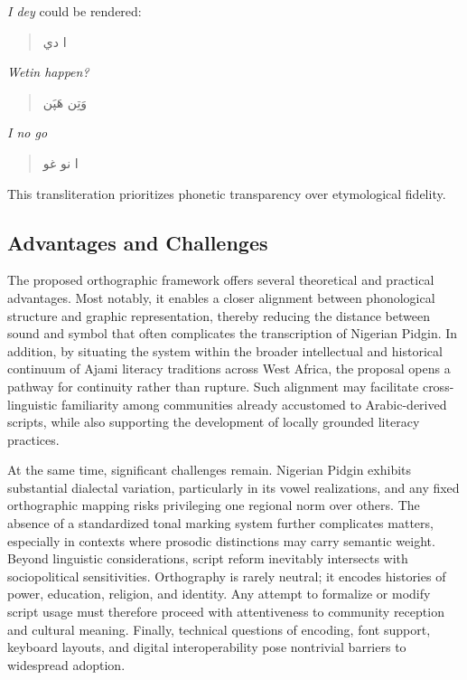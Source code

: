 \documentclass[12pt]{article}
\newcommand{\AR}[1]{\foreignlanguage{arabic}{#1}}
\begin{document}
\textit{I dey} could be rendered:

\begin{quote}
\AR{ا دي}
\end{quote}

\textit{Wetin happen?}

\begin{quote}
\AR{وَتِن هَپَن}
\end{quote}

\textit{I no go}

\begin{quote}
\AR{ا نو غو}
\end{quote}

This transliteration prioritizes phonetic transparency over etymological fidelity.

\subsection{Advantages and Challenges}

The proposed orthographic framework offers several theoretical and practical advantages. Most notably, it enables a closer alignment between phonological structure and graphic representation, thereby reducing the distance between sound and symbol that often complicates the transcription of Nigerian Pidgin. In addition, by situating the system within the broader intellectual and historical continuum of Ajami literacy traditions across West Africa, the proposal opens a pathway for continuity rather than rupture. Such alignment may facilitate cross-linguistic familiarity among communities already accustomed to Arabic-derived scripts, while also supporting the development of locally grounded literacy practices.

At the same time, significant challenges remain. Nigerian Pidgin exhibits substantial dialectal variation, particularly in its vowel realizations, and any fixed orthographic mapping risks privileging one regional norm over others. The absence of a standardized tonal marking system further complicates matters, especially in contexts where prosodic distinctions may carry semantic weight. Beyond linguistic considerations, script reform inevitably intersects with sociopolitical sensitivities. Orthography is rarely neutral; it encodes histories of power, education, religion, and identity. Any attempt to formalize or modify script usage must therefore proceed with attentiveness to community reception and cultural meaning. Finally, technical questions of encoding, font support, keyboard layouts, and digital interoperability pose nontrivial barriers to widespread adoption.
\end{document}
